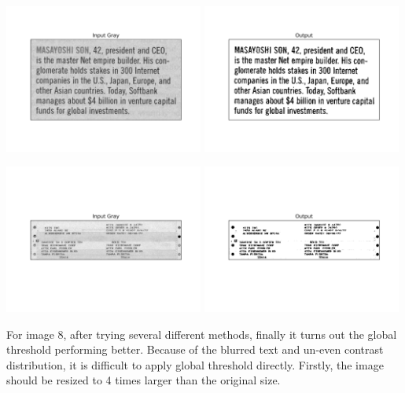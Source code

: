 \documentclass[titlepage]{article}
\begin{document}
\begin{center}
\includegraphics[width=0.49\textwidth]{img_6_gray.png}
\includegraphics[width=0.49\textwidth]{img_6_output.png}
\end{center}

\begin{center}
\includegraphics[width=0.49\textwidth]{img_7_gray.png}
\includegraphics[width=0.49\textwidth]{img_7_output.png}
\end{center}

For image 8, after trying several different methods, finally it turns out the global
threshold performing better. Because of the blurred text and un-even contrast
distribution, it is difficult to apply global threshold directly. Firstly, the
image should be resized to 4 times larger than the original size.
\end{document}
